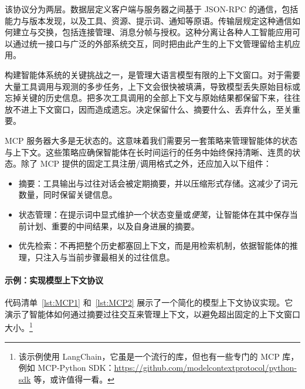 该协议分为两层。数据层定义客户端与服务器之间基于 JSON-RPC 的通信，包括能力与版本发现，以及工具、资源、提示词、通知等原语。传输层规定这种通信如何建立与交换，包括连接管理、消息分帧与授权。这种分离让各种人工智能应用可以通过统一接口与广泛的外部系统交互，同时把由此产生的上下文管理留给主机应用。

构建智能体系统的关键挑战之一，是管理大语言模型有限的上下文窗口。对于需要大量工具调用与观测的多步任务，上下文会很快被填满，导致模型丢失原始目标或忘掉关键的历史信息。把多次工具调用的全部上下文与原始结果都保留下来，往往放不进上下文窗口，因而造成遗忘。决定保留什么、摘要什么、丢弃什么，至关重要。

MCP 服务器大多是无状态的。这意味着我们需要另一套策略来管理智能体的状态与上下文。这些策略应确保智能体在长时间运行的任务中始终保持清晰、连贯的状态。除了 MCP 提供的固定工具注册/调用格式之外，还应加入以下组件：

\begin{itemize}
    \item 摘要：工具输出与过往对话会被定期摘要，并以压缩形式存储。这减少了词元数量，同时保留关键信息。
    \item 状态管理：在提示词中显式维护一个状态变量或{\em 便笺}，让智能体在其中保存当前计划、重要的中间结果，以及自身进展的摘要。
    \item 优先检索：不再把整个历史都塞回上下文，而是用检索机制，依据智能体的推理，只注入与当前步骤最相关的过往信息。
\end{itemize}


\paragraph{示例：实现模型上下文协议}
代码清单~\ref{lst:MCP1} 和~\ref{lst:MCP2} 展示了一个简化的模型上下文协议实现。它演示了智能体如何通过摘要过往交互来管理上下文，以避免超出固定的上下文窗口大小。\footnote{该示例使用 LangChain，它虽是一个流行的库，但也有一些专门的 MCP 库，例如 MCP-Python SDK：\url{https://github.com/modelcontextprotocol/python-sdk} 等，或许值得一看。}

